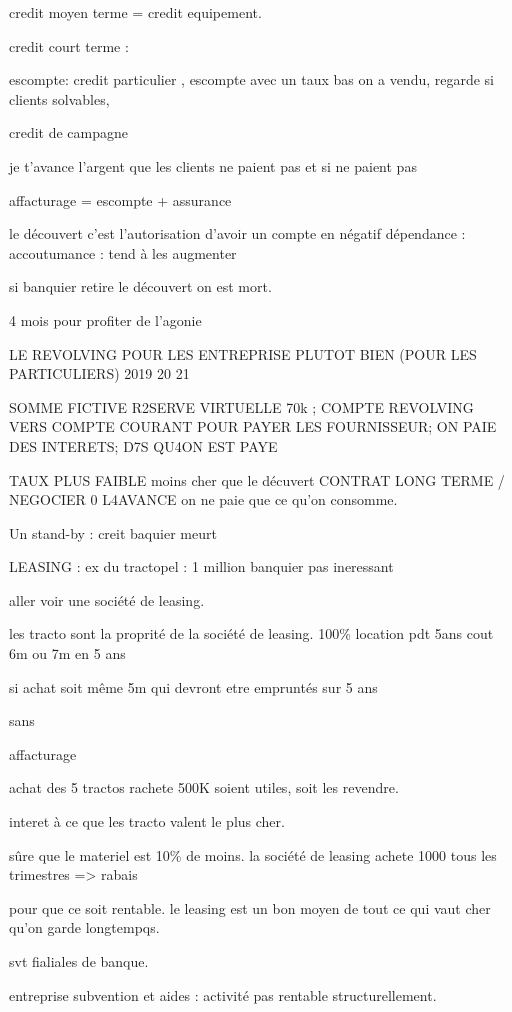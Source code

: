 \documentclass[a4paper,12pt]{article}
\begin{document}
credit moyen terme = credit equipement.

credit court terme :

escompte: credit particulier , escompte avec un taux bas
on a vendu, regarde si clients solvables,

credit de campagne

je t'avance l'argent que les clients ne paient pas et si ne paient pas

affacturage = escompte + assurance



le découvert c'est l'autorisation d'avoir un compte en négatif
dépendance : 
accoutumance : tend à les augmenter

si banquier retire le découvert on est mort.

4 mois pour profiter de l'agonie


LE REVOLVING POUR LES ENTREPRISE PLUTOT BIEN (POUR LES PARTICULIERS)
2019 20 21

SOMME FICTIVE R2SERVE VIRTUELLE 70k ;  COMPTE REVOLVING VERS COMPTE COURANT POUR PAYER LES FOURNISSEUR;
ON PAIE DES INTERETS; D7S QU4ON EST PAYE 

TAUX PLUS FAIBLE moins cher que le décuvert
CONTRAT LONG TERME / NEGOCIER 0 L4AVANCE 
on ne paie que ce qu'on consomme.


Un stand-by : creit baquier meurt



LEASING : 
ex du tractopel : 1 million
banquier pas ineressant

aller voir une société de leasing.

les tracto sont la proprité de la société de leasing. 100\%
location pdt 5ans  cout 6m ou 7m en 5 ans

si achat soit même 5m qui devront etre empruntés sur 5 ans

sans 

affacturage


achat des 5 tractos rachete 500K soient utiles, soit les revendre.

interet à ce que les tracto valent le plus cher.

sûre que le materiel est 10\% de moins. la société de leasing achete 1000 tous les trimestres => rabais

pour que ce soit rentable. le leasing est un bon moyen de tout ce qui vaut cher qu'on garde longtempqs.

svt fialiales de banque.



entreprise subvention et aides : activité pas rentable structurellement.
\end{document}
